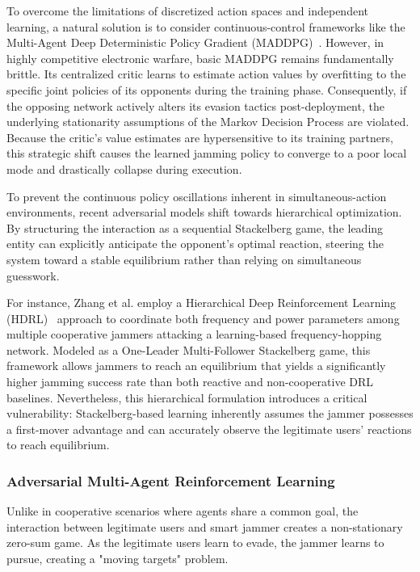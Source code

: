 \documentclass[conference]{IEEEtran}
\newcommand{\adm}[1]{{\color{orange}{[#1]}}}
\begin{document}
To overcome the limitations of discretized action spaces and independent learning, a natural solution is to consider continuous-control frameworks like the Multi-Agent Deep Deterministic Policy Gradient (MADDPG)~.
However, in highly competitive electronic warfare, basic MADDPG remains fundamentally brittle.
Its centralized critic learns to estimate action values by overfitting to the specific joint policies of its opponents during the training phase. 
Consequently, if the opposing network actively alters its evasion tactics post-deployment, the underlying stationarity assumptions of the Markov Decision Process are violated. 
Because the critic's value estimates are hypersensitive to its training partners, this strategic shift causes the learned jamming policy to converge to a poor local mode and drastically collapse during execution.

To prevent the continuous policy oscillations inherent in simultaneous-action environments, recent adversarial models shift towards hierarchical optimization. 
By structuring the interaction as a sequential Stackelberg game, the leading entity can explicitly anticipate the opponent's optimal reaction, steering the system toward a stable equilibrium rather than relying on simultaneous guesswork.

For instance, Zhang et al. employ a Hierarchical Deep Reinforcement Learning (HDRL)~ approach to coordinate both frequency and power parameters among multiple cooperative jammers attacking a learning-based frequency-hopping network.
Modeled as a One-Leader Multi-Follower Stackelberg game, this framework allows jammers 
to reach an equilibrium that yields a significantly higher jamming success rate than both reactive and non-cooperative DRL baselines.
Nevertheless, this hierarchical formulation introduces a critical vulnerability: Stackelberg-based learning inherently assumes the jammer possesses a first-mover advantage and can accurately observe the legitimate users' reactions to reach equilibrium.

\subsubsection{Adversarial Multi-Agent Reinforcement Learning}
Unlike in cooperative scenarios where agents share a common goal, the interaction between legitimate users and smart jammer creates a non-stationary zero-sum game. 
As the legitimate users learn to evade, the jammer learns to pursue, creating a "moving targets" problem.
\end{document}
